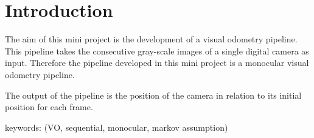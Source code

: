 \section{Introduction}
The aim of this mini project is the development of a visual odometry pipeline. This pipeline takes the consecutive gray-scale images of a single digital camera as input. Therefore the pipeline developed in this mini project is a monocular visual odometry pipeline.

The output of the pipeline is the position of the camera in relation to its initial position for each frame.



keywords:
(VO, sequential, monocular, markov assumption)